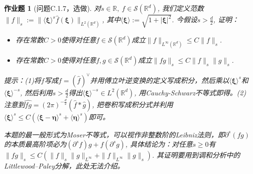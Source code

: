 \documentclass[UTF8,fontset=windows,12pt]{ctexart}
\theoremstyle{kaiti-theorem}
\newtheorem{problem}{作业题}
\numberwithin{equation}{section}
\newcommand{\R}{\mathbb{R}}
\newcommand{\sh}{\mathcal{S}}
\newcommand{\p}{\partial}
\newcommand{\xxi}{\boldsymbol{\xi}}
\newcommand{\eeta}{\boldsymbol{\eta}}
\newcommand{\xxee}{\langle\boldsymbol{\xi}\rangle}
\newcommand{\xeeta}{\langle\boldsymbol{\eta}\rangle}
\begin{document}
\begin{problem}[问题C.1.7，选做] 
对$s\in\R,~f\in \sh(\R^d)$, 我们定义范数$\|f\|_{s}:=\|\xxee^s\hat{f}(\xxi)\|_{L^2(\R^d)}$, 其中$\xxee:=\sqrt{1+|\xxi|^2}$. 今假设$s>\frac{d}{2}$, 证明：
\begin{itemize}
\item [(1)] 存在常数$C>0$使得对任意$f\in \sh(\R^d)$成立$\|f\|_{L^\infty(\R^d)}\leqslant C\|f\|_{s}$.
\item [(2)] 存在常数$C>0$使得对任意$f,g\in \sh(\R^d)$成立$\|fg\|_{s}\leqslant C\|f\|_{s}\|g\|_{s}$.
\end{itemize}

提示：(1)将$f$写成$f=(\hat{f})^\vee$并用傅立叶逆变换的定义写成积分，然后乘以$\xxee^s$和$\xxee^{-s}$, 然后利用$s>\frac{d}{2}$得出$\xxee^{-s}\in L^2(\R^d)$, 用Cauchy-Schwarz不等式即得。(2) 注意到$\widehat{fg}=(2\pi)^{-\frac{d}{2}}(\hat{f}*\hat{g})$, 把卷积写成积分式并利用$\xxee^s\leqslant C(\langle\xxi-\eeta\rangle^s+\xeeta^s)$即可。

本题的最一般形式为Moser不等式，可以视作非整数阶的Leibniz法则，即$\p^s(fg)$的本质最高阶项必为$(\p^s f)g+f(\p^s g)$, 具体结论为：对任意$s\geqslant 0$有$\|fg\|_{s}\leqslant C(\|f\|_{s}\|g\|_{L^\infty}+\|f\|_{L^\infty}\|g\|_{s})$. 其证明要用到调和分析中的Littlewood--Paley分解，此处无法介绍。
\end{problem}
\end{document}
